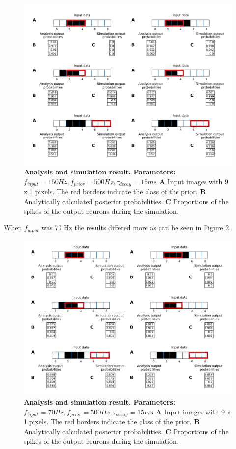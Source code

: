 \begin{figure}
  \includegraphics[width=\linewidth]{figures/1D/1D_150_500_15.png}
  \caption{\textbf{Analysis and simulation result. Parameters: } $f_{input} = 150 Hz, f_{prior} = 500 Hz, \tau_{decay} = 15 ms$ \textbf{A} Input images with 9 x 1 pixels. The red borders indicate the class of the prior. \textbf{B} Analytically calculated posterior probabilities. \textbf{C} Proportions of the spikes of the output neurons during the simulation.}
  \label{fig:1D_150_500_15}
\end{figure}

When $f_{input}$ was 70 Hz the results differed more as can be seen in Figure \ref{fig:1D_70_500_15}.

\begin{figure}
  \includegraphics[width=\linewidth]{figures/1D/1D_70_500_15.png}
  \caption{\textbf{Analysis and simulation result. Parameters: }$f_{input} = 70 Hz, f_{prior} = 500 Hz, \tau_{decay} = 15 ms$ \textbf{A} Input images with 9 x 1 pixels. The red borders indicate the class of the prior. \textbf{B} Analytically calculated posterior probabilities. \textbf{C} Proportions of the spikes of the output neurons during the simulation.}
  \label{fig:1D_70_500_15}
\end{figure}


